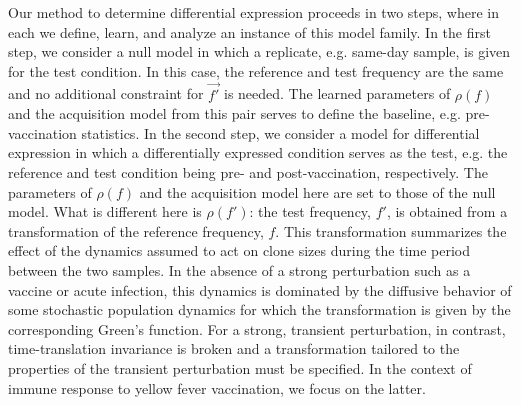 \documentclass[letterpaper,english,prl,reprint,longbibliography]{revtex4-1}
\begin{document}
Our method to determine differential expression proceeds in two steps, where in each we define, learn, and analyze an instance of this model family.
In the first step, we consider a null model in which a replicate, e.g. same-day sample, is given for the test condition. 
In this case, the reference and test frequency are the same and no additional constraint for $\vec{f'}$ is needed.
The learned parameters of $\rho(f)$ and the acquisition model from this pair serves to define the baseline, e.g. pre-vaccination statistics.
In the second step, we consider a model for differential expression in which a differentially expressed condition serves as the test, e.g. the reference and test condition being pre- and post-vaccination, respectively. 
The parameters of $\rho(f)$ and the acquisition model here are set to those of the null model.
What is different here is $\rho(f')$: the test frequency, $f'$, is obtained from a transformation of the reference frequency, $f$.  
This transformation summarizes the effect of the dynamics assumed to act on clone sizes during the time period between the two samples. 
In the absence of a strong perturbation such as a vaccine or acute infection, this dynamics is dominated by the diffusive behavior of some stochastic population dynamics for which the transformation is given by the corresponding Green's function.  
For a strong, transient perturbation, in contrast, time-translation invariance is broken and a transformation tailored to the properties of the transient perturbation must be specified. 
In the context of immune response to yellow fever vaccination, we focus on the latter. 
\end{document}
